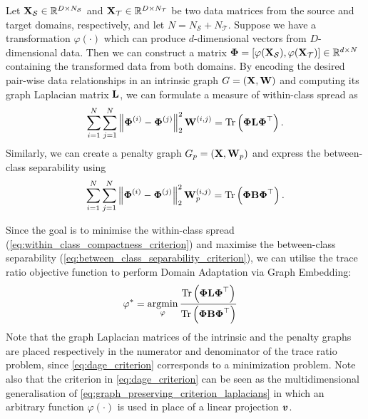 \documentclass[journal]{IEEEtran}
\renewcommand{\vector}[1]{\ensuremath{\bm{\lowercase{#1}}}}
\renewcommand{\matrix}[1]{\ensuremath{\bm{\mathbf{\uppercase{#1}}}}}
\newcommand{\mX}{\matrix{x}}
\newcommand{\mW}{\matrix{W}}
\newcommand{\mL}{\matrix{L}}
\newcommand{\norm}[1]{\ensuremath{\left\|#1 \right\|}}
\DeclareMathOperator*{\argmin}{argmin} \DeclareMathOperator*{\argmax}{argmax}
\newcommand{\Src}{\mathcal{S}} \newcommand{\Tgt}{\mathcal{T}}
\newcommand{\tr}{\text{Tr}}
\begin{document}
Let $\mX_\Src \in \mathbb{R}^{D\times N_\Src}$ and $\mX_\Tgt \in \mathbb{R}^{D\times N_\Tgt}$ be two data matrices from the source and target domains, respectively, and let $N = N_\Src + N_\Tgt$. Suppose we have a transformation $\varphi(\cdot)$ which can produce $d$-dimensional vectors from $D$-dimensional data. Then we can construct a matrix $\matrix{\Phi} = [\varphi( \mX_\Src ) , \varphi( \mX_\Tgt )] \in \mathbb{R}^{d \times N}$ containing the transformed data from both domains. By encoding the desired pair-wise data relationships in an intrinsic graph $G=(\mX, \mW)$ and computing its graph Laplacian matrix $\mL$, we can formulate a measure of within-class spread as
\begin{align}
  \sum_{
    \substack{i=1}
  }^{N}
  \sum_{
    \substack{j=1}
  }^{N}
  \norm{
    \matrix{\Phi}^{(i)}
    -
    \matrix{\Phi}^{(j)}
  }_2^2
  \matrix{W}^{(i,j)}
  =
  \tr \left(
  \matrix{\Phi}
  \matrix{L}
  \matrix{\Phi}^\top
  \right).
  \label{eq:within_class_compactness_criterion}
\end{align}
Similarly, we can create a penalty graph $G_p = (\mX, \mW_p)$ and express the between-class separability using
\begin{align}
  \sum_{
    \substack{i=1}
  }^{N}
  \sum_{
    \substack{j=1}
  }^{N}
  \norm{
    \matrix{\Phi}^{(i)}
    -
    \matrix{\Phi}^{(j)}
  }_2^2
  \matrix{W}_p^{(i,j)}
  =
  \tr \left(
  \matrix{\Phi}
  \matrix{B}
  \matrix{\Phi}^\top
  \right).
  \label{eq:between_class_separability_criterion}
\end{align}

Since the goal is to minimise the within-class spread (\cref{eq:within_class_compactness_criterion}) and maximise the between-class separability (\cref{eq:between_class_separability_criterion}), we can utilise the trace ratio objective function to perform Domain Adaptation via Graph Embedding:
\begin{align}
  \varphi^{*}
  &=
  \argmin_{\varphi} 
  \frac{
    \tr
    \left(
    \matrix{\Phi}
    \matrix{L}
    \matrix{\Phi}^\top
    \right)
  }{
    \tr
    \left(
    \matrix{\Phi}
    \matrix{B}
    \matrix{\Phi}^\top
    \right)
  }
  \label{eq:dage_criterion}
\end{align}
Note that the graph Laplacian matrices of the intrinsic and the penalty graphs are placed respectively in the numerator and denominator of the trace ratio problem, since \cref{eq:dage_criterion} corresponds to a minimization problem. 
Note also that the criterion in \cref{eq:dage_criterion} can be seen as the multidimensional generalisation of \cref{eq:graph_preserving_criterion_laplacians} in which an arbitrary function $\varphi(\cdot)$ is used in place of a linear projection $\vector{v}$.
\end{document}
